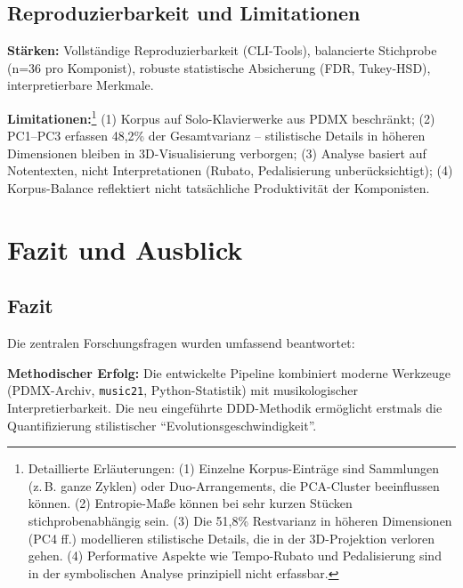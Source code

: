 \documentclass[12pt,a4paper]{article}
\theoremstyle{definition}
\begin{document}
\subsection{Reproduzierbarkeit und Limitationen}
\textbf{Stärken:} Vollständige Reproduzierbarkeit (CLI-Tools), balancierte Stichprobe (n=36 pro Komponist), robuste statistische Absicherung (FDR, Tukey-HSD), interpretierbare Merkmale.

\textbf{Limitationen:}\footnote{Detaillierte Erläuterungen: (1) Einzelne Korpus-Einträge sind Sammlungen (z.\,B. ganze Zyklen) oder Duo-Arrangements, die PCA-Cluster beeinflussen können. (2) Entropie-Maße können bei sehr kurzen Stücken stichprobenabhängig sein. (3) Die 51,8\% Restvarianz in höheren Dimensionen (PC4 ff.) modellieren stilistische Details, die in der 3D-Projektion verloren gehen. (4) Performative Aspekte wie Tempo-Rubato und Pedalisierung sind in der symbolischen Analyse prinzipiell nicht erfassbar.} (1) Korpus auf Solo-Klavierwerke aus PDMX beschränkt; (2) PC1--PC3 erfassen 48,2\% der Gesamtvarianz -- stilistische Details in höheren Dimensionen bleiben in 3D-Visualisierung verborgen; (3) Analyse basiert auf Notentexten, nicht Interpretationen (Rubato, Pedalisierung unberücksichtigt); (4) Korpus-Balance reflektiert nicht tatsächliche Produktivität der Komponisten.

\section{Fazit und Ausblick}
\subsection{Fazit}
Die zentralen Forschungsfragen wurden umfassend beantwortet:

\textbf{Methodischer Erfolg:} Die entwickelte Pipeline kombiniert moderne Werkzeuge (PDMX-Archiv, \texttt{music21}, Python-Statistik) mit musikologischer Interpretierbarkeit. Die neu eingeführte DDD-Methodik ermöglicht erstmals die Quantifizierung stilistischer \enquote{Evolutionsgeschwindigkeit}.
\end{document}
